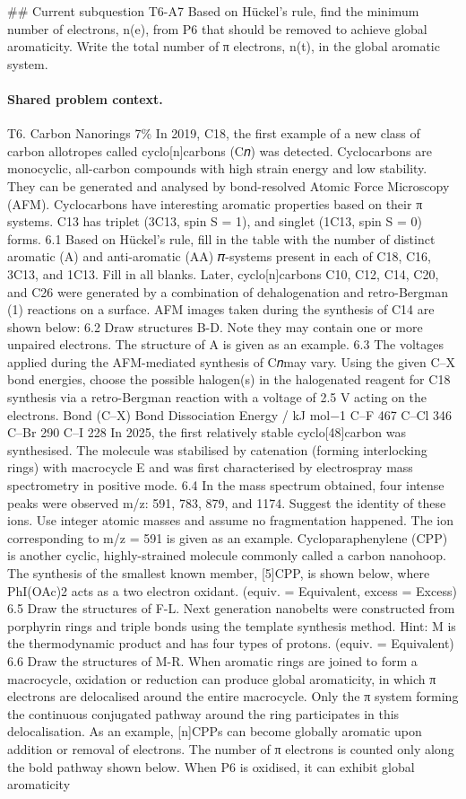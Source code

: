 \#\# Current subquestion T6-A7
Based on Hückel’s rule, find the minimum number of electrons, n(e), from P6 that should be removed to achieve global aromaticity. Write the total number of π electrons, n(t), in the global aromatic system.

\paragraph{Shared problem context.}
T6. Carbon Nanorings 7\% In 2019, C18, the first example of a new class of carbon allotropes called cyclo[n]carbons (C𝑛) was detected. Cyclocarbons are monocyclic, all-carbon compounds with high strain energy and low stability. They can be generated and analysed by bond-resolved Atomic Force Microscopy (AFM). Cyclocarbons have interesting aromatic properties based on their π systems. C13 has triplet (3C13, spin S = 1), and singlet (1C13, spin S = 0) forms. 6.1 Based on Hückel’s rule, fill in the table with the number of distinct aromatic (A) and anti-aromatic (AA) 𝜋-systems present in each of C18, C16, 3C13, and 1C13. Fill in all blanks. Later, cyclo[n]carbons C10, C12, C14, C20, and C26 were generated by a combination of dehalogenation and retro-Bergman (1) reactions on a surface. AFM images taken during the synthesis of C14 are shown below: 6.2 Draw structures B-D. Note they may contain one or more unpaired electrons. The structure of A is given as an example. 6.3 The voltages applied during the AFM-mediated synthesis of C𝑛may vary. Using the given C–X bond energies, choose the possible halogen(s) in the halogenated reagent for C18 synthesis via a retro-Bergman reaction with a voltage of 2.5 V acting on the electrons. Bond (C–X) Bond Dissociation Energy / kJ mol−1 C–F 467 C–Cl 346 C–Br 290 C–I 228 In 2025, the first relatively stable cyclo[48]carbon was synthesised. The molecule was stabilised by catenation (forming interlocking rings) with macrocycle E and was first characterised by electrospray mass spectrometry in positive mode. 6.4 In the mass spectrum obtained, four intense peaks were observed m/z: 591, 783, 879, and 1174. Suggest the identity of these ions. Use integer atomic masses and assume no fragmentation happened. The ion corresponding to m/z = 591 is given as an example. Cycloparaphenylene (CPP) is another cyclic, highly-strained molecule commonly called a carbon nanohoop. The synthesis of the smallest known member, [5]CPP, is shown below, where PhI(OAc)2 acts as a two electron oxidant. (equiv. = Equivalent, excess = Excess) 6.5 Draw the structures of F-L. Next generation nanobelts were constructed from porphyrin rings and triple bonds using the template synthesis method. Hint: M is the thermodynamic product and has four types of protons. (equiv. = Equivalent) 6.6 Draw the structures of M-R. When aromatic rings are joined to form a macrocycle, oxidation or reduction can produce global aromaticity, in which π electrons are delocalised around the entire macrocycle. Only the π system forming the continuous conjugated pathway around the ring participates in this delocalisation. As an example, [n]CPPs can become globally aromatic upon addition or removal of electrons. The number of π electrons is counted only along the bold pathway shown below. When P6 is oxidised, it can exhibit global aromaticity 